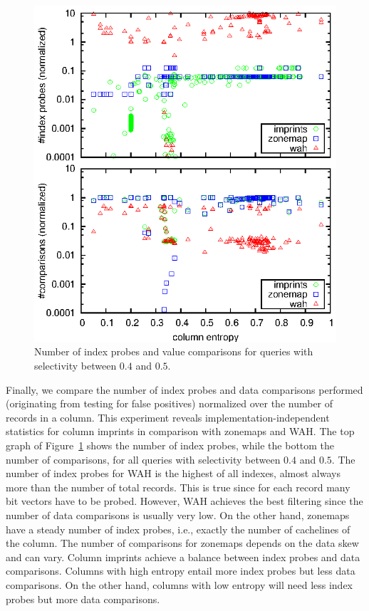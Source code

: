 \begin{figure}
\includegraphics{figs/static/stats}
\caption{Number of index probes and value comparisons for queries with selectivity between $0.4$ and $0.5$.}
\label{fig:stats}
\end{figure}

Finally, we compare the number of index probes and data comparisons performed (originating from testing for false positives) normalized over the number of
records in a column. This experiment reveals implementation-independent
statistics for column imprints in comparison with zonemaps and WAH. The top
graph of Figure~\ref{fig:stats} shows the number of index probes, while the
bottom the number of comparisons, for all queries with selectivity between
$0.4$ and $0.5$. The number of index probes for WAH is the highest of all
indexes, almost always more than the number of total records. This is true
since for each record many bit vectors have to be probed. However, WAH achieves
the best filtering since the number of data comparisons is usually very low. On
the other hand, zonemaps have a steady number of index probes, i.e., exactly
the number of cachelines of the column. The number of comparisons for zonemaps
depends on the data skew and can vary. Column imprints achieve a balance
between index probes and data comparisons. Columns with high entropy entail
more index probes but less data comparisons. On the
other hand, columns with low entropy will need less index probes but more data
comparisons.

